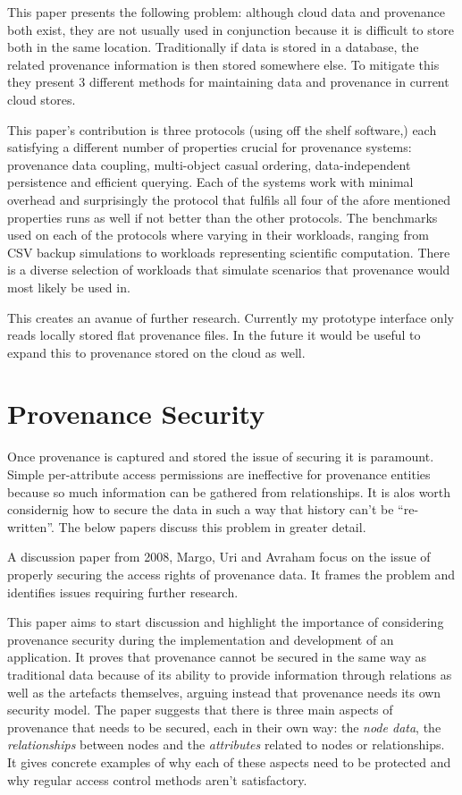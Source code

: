 This paper presents the following problem: although cloud data and provenance both exist, they are not usually used in conjunction because it is difficult to store both in the same location. Traditionally if data is stored in a database, the related provenance information is then stored somewhere else. To mitigate this they present 3 different methods for maintaining data and provenance in current cloud stores.

This paper's contribution is three protocols (using off the shelf software,) each satisfying a different number of properties crucial for provenance systems: provenance data coupling, multi-object casual ordering, data-independent persistence and efficient querying. Each of the systems work with minimal overhead and surprisingly the protocol that fulfils all four of the afore mentioned properties runs as well if not better than the other protocols. The benchmarks used on each of the protocols where varying in their workloads, ranging from CSV backup simulations to workloads representing scientific computation. There is a diverse selection of workloads that simulate scenarios that provenance would most likely be used in.

This creates an avanue of further research. Currently my prototype interface only reads locally stored flat provenance files. In the future it would be useful to expand this to provenance stored on the cloud as well.

\section{Provenance Security}
\label{sec:provenance_security}

Once provenance is captured and stored the issue of securing it is paramount. Simple per-attribute access permissions are ineffective for provenance entities because so much information can be gathered from relationships. It is alos worth considernig how to secure the data in such a way that history can't be ``re-written''. The below papers discuss this problem in greater detail.


A discussion paper from 2008, Margo, Uri and Avraham focus on the issue of properly securing the access rights of provenance data. It frames the problem and identifies issues requiring further research.

This paper aims to start discussion and highlight the importance of considering provenance security during the implementation and development of an application. It proves that provenance cannot be secured in the same way as traditional data because of its ability to provide information through relations as well as the artefacts themselves, arguing instead that provenance needs its own security model. The paper suggests that there is three main aspects of provenance that needs to be secured, each in their own way: the \textit{node data}, the \textit{relationships} between nodes and the \textit{attributes} related to nodes or relationships. It gives concrete examples of why each of these aspects need to be protected and why regular access control methods aren't satisfactory.

